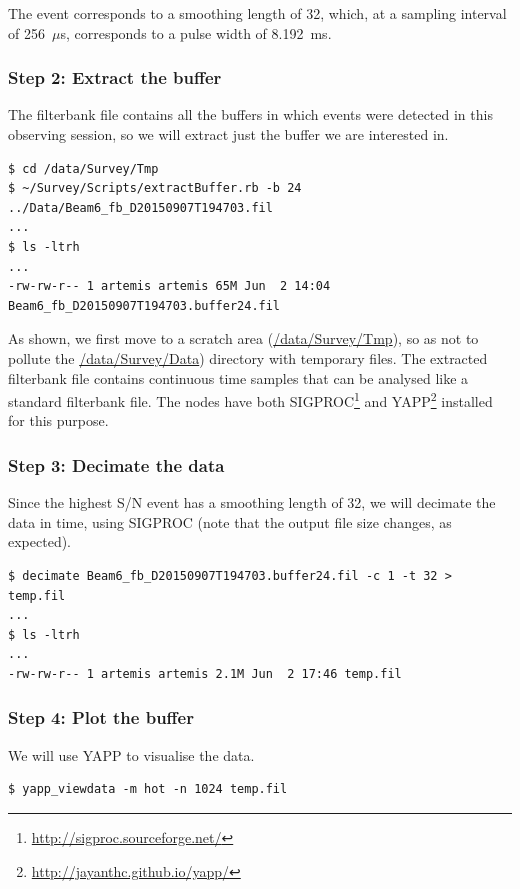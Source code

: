 \documentclass{article}
\begin{document}
The event corresponds to a smoothing length of 32, which, at a sampling
interval of 256~$\mu$s, corresponds to a pulse width of 8.192~ms.


\subsubsection{Step 2: Extract the buffer}

The filterbank file \url{} contains all the buffers in which events were
detected in this observing session, so we will extract just the buffer we are
interested in.

\small{
\begin{verbatim}
$ cd /data/Survey/Tmp
$ ~/Survey/Scripts/extractBuffer.rb -b 24 ../Data/Beam6_fb_D20150907T194703.fil
...
$ ls -ltrh
...
-rw-rw-r-- 1 artemis artemis 65M Jun  2 14:04 Beam6_fb_D20150907T194703.buffer24.fil
\end{verbatim}
}

As shown, we first move to a scratch area (\url{/data/Survey/Tmp}), so as not
to pollute the \url{/data/Survey/Data}) directory with temporary files. The
extracted filterbank file contains continuous time samples that can be analysed
like a standard filterbank file. The nodes have both
SIGPROC\footnote{\url{http://sigproc.sourceforge.net/}} and
YAPP\footnote{\url{http://jayanthc.github.io/yapp/}} installed for this purpose.


\subsubsection{Step 3: Decimate the data}

Since the highest S/N event has a smoothing length of 32, we will decimate the
data in time, using SIGPROC (note that the output file size changes, as
expected).

\small{
\begin{verbatim}
$ decimate Beam6_fb_D20150907T194703.buffer24.fil -c 1 -t 32 > temp.fil
...
$ ls -ltrh
...
-rw-rw-r-- 1 artemis artemis 2.1M Jun  2 17:46 temp.fil
\end{verbatim}
}


\subsubsection{Step 4: Plot the buffer}

We will use YAPP to visualise the data.

\small{
\begin{verbatim}
$ yapp_viewdata -m hot -n 1024 temp.fil
\end{verbatim}
}
\end{document}
